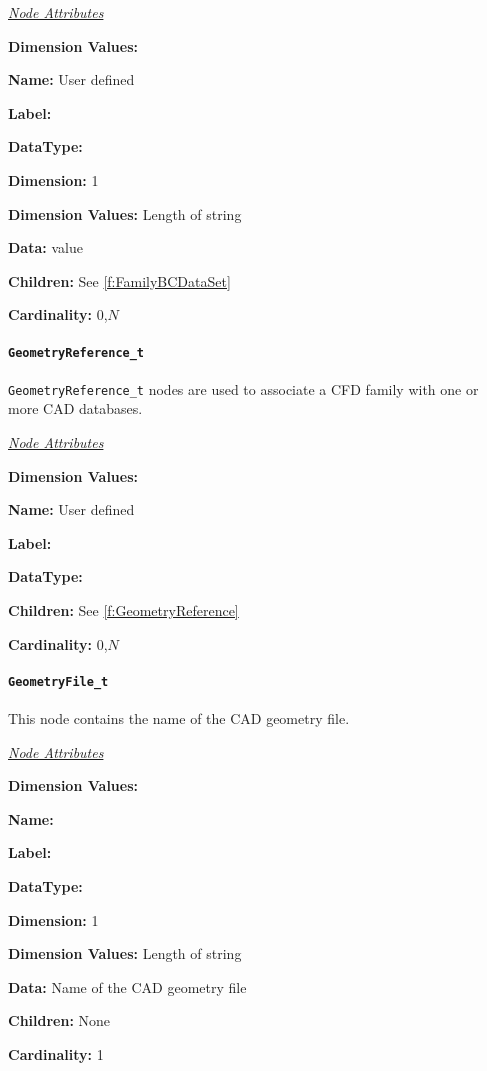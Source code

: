 \textit{\uline{Node Attributes}}
\begin{Ventryic}{\textbf{Dimension Values:}}
\item [\textbf{Name:}]
      User defined
\item [\textbf{Label:}]
\item [\textbf{DataType:}]
\item [\textbf{Dimension:}]
      1
\item [\textbf{Dimension Values:}]
      Length of string
\item [\textbf{Data:}]
       value
\item [\textbf{Children:}]
      See \autoref{f:FamilyBCDataSet}
\item [\textbf{Cardinality:}]
      0,$N$
\end{Ventryic}

\paragraph{\texttt{GeometryReference\_t}}

\texttt{GeometryReference\_t} nodes are used to associate
a CFD family with one or more CAD databases.

\textit{\uline{Node Attributes}}
\begin{Ventryic}{\textbf{Dimension Values:}}
\item [\textbf{Name:}]
      User defined
\item [\textbf{Label:}]
\item [\textbf{DataType:}]
\item [\textbf{Children:}]
      See \autoref{f:GeometryReference}
\item [\textbf{Cardinality:}]
      0,$N$
\end{Ventryic}

\paragraph{\texttt{GeometryFile\_t}}

This node contains the name of the CAD geometry file.

\textit{\uline{Node Attributes}}
\begin{Ventryic}{\textbf{Dimension Values:}}
\item [\textbf{Name:}]
\item [\textbf{Label:}]
\item [\textbf{DataType:}]
\item [\textbf{Dimension:}]
      1
\item [\textbf{Dimension Values:}]
      Length of string
\item [\textbf{Data:}]
      Name of the CAD geometry file
\item [\textbf{Children:}]
      None
\item [\textbf{Cardinality:}]
      1
\end{Ventryic}

